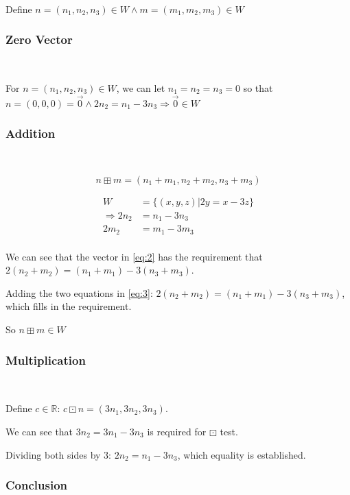 \documentclass{article}
\def\R{\mathbb{R}}
\begin{document}
~

Define $n=(n_1,n_2,n_3) \in W \land m=(m_1,m_2,m_3) \in W$

\subsubsection{Zero Vector}

~

For $n=(n_1,n_2,n_3) \in W$, we can let $n_1=n_2=n_3=0$ so that $n=(0,0,0)=\overrightarrow{0} \land 2n_2=n_1-3n_3 \Rightarrow \overrightarrow{0} \in W$

\subsubsection{Addition}

~

\begin{equation}
\tag{3.2.2-1}
\label{eq:2}
n\boxplus m=(n_1+m_1,n_2+m_2,n_3+m_3)
\end{equation}

\begin{equation}
\tag{3.2.2-2}
\label{eq:3}
\begin{split}
W & =\{(x,y,z)|2y=x-3z\} \\
\Rightarrow 2n_2 & = n_1-3n_3 \\
2m_2 & = m_1-3m_3 \\
\end{split}
\end{equation}

We can see that the vector in \ref{eq:2} has the requirement that $2(n_2+m_2)=(n_1+m_1)-3(n_3+m_3)$.

Adding the two equations in \ref{eq:3}: $2(n_2+m_2)=(n_1+m_1)-3(n_3+m_3)$, which fills in the requirement.

So $n\boxplus m \in W$

\subsubsection{Multiplication}

~

Define $c \in \R$: $c \boxdot n = (3n_1,3n_2,3n_3)$.

We can see that $3n_2=3n_1-3n_3$ is required for $\boxdot$ test.

Dividing both sides by 3: $2n_2=n_1-3n_3$, which equality is established.

\subsubsection{Conclusion}
\end{document}
